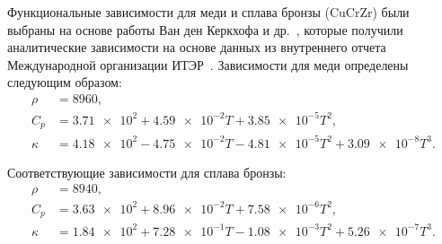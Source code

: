 \begin{comment}
Для бериллия использовались функциональные зависимости, рекомендованные Толиасом~\cite{Tolias2022} на основе критического анализа литературных данных. Изменением теплофизических свойств при переходе из альфа- в бета-фазу пренебрегалось:
\begin{subequations}
    \label{eq:app/Be_props}
    \begin{align}
        \rho              & =  \num{1850},                                                                         \\
        C_p M_\mathrm{Be} & =  \num{21.205} + \num{5.694e-3} T + \num{0.962e-6} T^2 - \num{0.5874e6} T^{-2},       \\
        \kappa            & =  \num{148.8912} - \num{76.3780e-3} T + \num{12.0174e-6} T^2 + \num{6.5407e6} T^{-2},
    \end{align}
\end{subequations}
где \( M_\mathrm{Be}=\SI{9.012e-3}{\kilogram\per\mole} \) "--- молярная масса бериллия.
\end{comment}

Функциональные зависимости для меди и сплава бронзы (CuCrZr) были выбраны на основе работы Ван ден Керкхофа и др.~\cite{VandenKerkhof2021}, которые получили аналитические зависимости на основе данных из внутреннего отчета Международной организации ИТЭР~\cite{komarov2013thermal}. Зависимости для меди определены следующим образом:
\begin{subequations}
    \label{eq:app/Cu_props}
    \begin{align}
        \rho   & =  \num{8960},                                                             \\
        C_p    & =  \num{3.71e2} + \num{4.59e-2} T + \num{3.85e-5} T^2 ,                    \\
        \kappa & =  \num{4.18e2} - \num{4.75e-2} T - \num{4.81e-5} T^2 + \num{3.09e-8} T^3.
    \end{align}
\end{subequations}

Соответствующие зависимости для сплава бронзы:
\begin{subequations}
    \label{eq:app/CuCrZr_props}
    \begin{align}
        \rho   & =  \num{8940},                                                             \\
        C_p    & =  \num{3.63e2} + \num{8.96e-2} T + \num{7.58e-6} T^2 ,                    \\
        \kappa & = \num{1.84e2} + \num{7.28e-1} T - \num{1.08e-3} T^2 +  \num{5.26e-7} T^3.
    \end{align}
\end{subequations}

